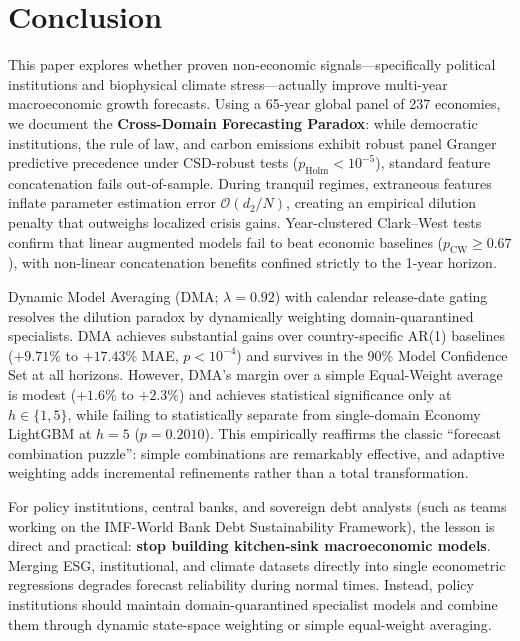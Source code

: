\documentclass[11pt,a4paper]{article}
\begin{document}
\section{Conclusion}
\label{sec:conclusion}

This paper explores whether proven non-economic signals---specifically political institutions and biophysical climate stress---actually improve multi-year macroeconomic growth forecasts. Using a 65-year global panel of 237 economies, we document the \textbf{Cross-Domain Forecasting Paradox}: while democratic institutions, the rule of law, and carbon emissions exhibit robust panel Granger predictive precedence under CSD-robust tests ($p_{\text{Holm}} < 10^{-5}$), standard feature concatenation fails out-of-sample. During tranquil regimes, extraneous features inflate parameter estimation error $\mathcal{O}(d_2/N)$, creating an empirical dilution penalty that outweighs localized crisis gains. Year-clustered Clark--West tests confirm that linear augmented models fail to beat economic baselines ($p_{\text{CW}} \ge 0.67$), with non-linear concatenation benefits confined strictly to the 1-year horizon.

Dynamic Model Averaging (DMA; $\lambda = 0.92$) with calendar release-date gating resolves the dilution paradox by dynamically weighting domain-quarantined specialists. DMA achieves substantial gains over country-specific AR(1) baselines ($+9.71\%$ to $+17.43\%$ MAE, $p < 10^{-4}$) and survives in the 90\% Model Confidence Set at all horizons. However, DMA's margin over a simple Equal-Weight average is modest ($+1.6\%$ to $+2.3\%$) and achieves statistical significance only at $h \in \{1, 5\}$, while failing to statistically separate from single-domain Economy LightGBM at $h=5$ ($p = 0.2010$). This empirically reaffirms the classic ``forecast combination puzzle'': simple combinations are remarkably effective, and adaptive weighting adds incremental refinements rather than a total transformation.

For policy institutions, central banks, and sovereign debt analysts (such as teams working on the IMF-World Bank Debt Sustainability Framework), the lesson is direct and practical: \textbf{stop building kitchen-sink macroeconomic models}. Merging ESG, institutional, and climate datasets directly into single econometric regressions degrades forecast reliability during normal times. Instead, policy institutions should maintain domain-quarantined specialist models and combine them through dynamic state-space weighting or simple equal-weight averaging.
\end{document}
